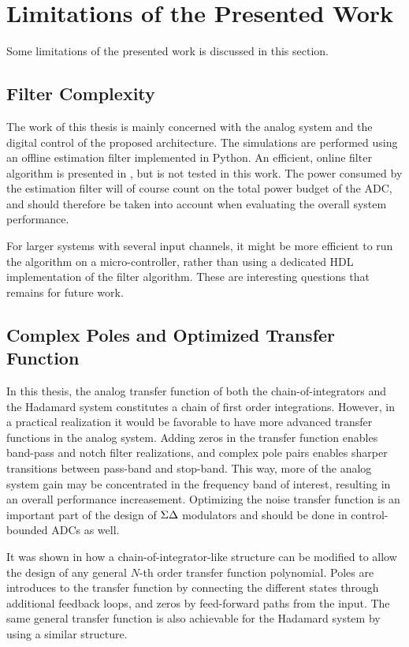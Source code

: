 \section{Limitations of the Presented Work}
Some limitations of the presented work is discussed in this section.


\subsection{Filter Complexity}
The work of this thesis is mainly concerned with the analog system and the digital control of the proposed architecture. The simulations are performed using an offline estimation filter implemented in Python. An efficient, online filter algorithm is presented in \cite{malmberg_thesis}, but is not tested in this work. The power consumed by the estimation filter will of course count on the total power budget of the ADC, and should therefore be taken into account when evaluating the overall system performance.

For larger systems with several input channels, it might be more efficient to run the algorithm on a micro-controller, rather than using a dedicated HDL implementation of the filter algorithm. These are interesting questions that remains for future work.


\subsection{Complex Poles and Optimized Transfer Function}
In this thesis, the analog transfer function of both the chain-of-integrators and the Hadamard system constitutes a chain of first order integrations. However, in a practical realization it would be favorable to have more advanced transfer functions in the analog system. Adding zeros in the transfer function enables band-pass and notch filter realizations, and complex pole pairs enables sharper transitions between pass-band and stop-band. This way, more of the analog system gain may be concentrated in the frequency band of interest, resulting in an overall performance increasement. Optimizing the noise transfer function is an important part of the design of $\Sigma\Delta$ modulators and should be done in control-bounded ADCs as well.

It was shown in \cite{malmberg_thesis} how a chain-of-integrator-like structure can be modified to allow the design of any general $N$-th order transfer function polynomial. Poles are introduces to the transfer function by connecting the different states through additional feedback loops, and zeros by feed-forward paths from the input. The same general transfer function is also achievable for the Hadamard system by using a similar structure.

